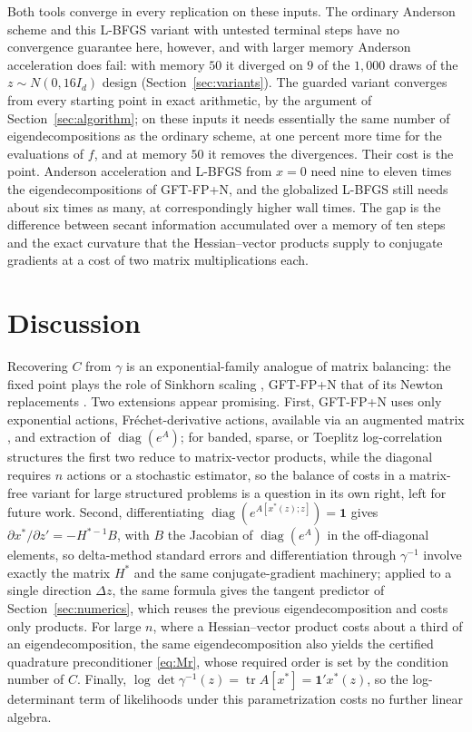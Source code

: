 \documentclass[11pt]{article}
\newcommand{\tr}{\operatorname{tr}}
\newcommand{\diag}{\operatorname{diag}}
\newcommand{\one}{\mathbf{1}}
\begin{document}
Both tools converge in every replication on these inputs. The
ordinary Anderson scheme and this L-BFGS variant with untested
terminal steps have no convergence guarantee here, however, and with
larger memory Anderson acceleration does fail: with memory $50$ it
diverged on $9$ of the $1{,}000$ draws of the $z\sim N(0,16I_d)$
design (Section~\ref{sec:variants}). The guarded variant converges
from every starting point in exact arithmetic, by the argument of
Section~\ref{sec:algorithm}; on these inputs it needs essentially the
same number of eigendecompositions as the ordinary scheme, at one
percent more time for the evaluations of $f$, and at memory $50$ it
removes the divergences. Their cost is the point. Anderson acceleration and L-BFGS from $x=0$
need nine to eleven times the eigendecompositions of GFT-FP+N, and
the globalized L-BFGS still needs about six times as many, at
correspondingly higher wall times.
The gap is the difference between secant information accumulated over
a memory of ten steps and the exact curvature that the Hessian--vector
products supply to conjugate gradients at a cost of two matrix
multiplications each.

\section{Discussion}\label{sec:discussion}

Recovering $C$ from $\gamma$ is an exponential-family analogue of
matrix balancing: the fixed point plays the role of Sinkhorn scaling
\citep{Sinkhorn:1964}, GFT-FP+N that of its Newton replacements
\citep{KnightRuiz:2013}. Two extensions appear promising. First, GFT-FP+N uses only
exponential actions, Fr\'echet-derivative actions, available via an
augmented matrix \citep{AlMohyHigham:2009}, and extraction of
$\diag(e^{A})$; for banded, sparse, or Toeplitz log-correlation
structures the first two reduce to matrix-vector products, while the
diagonal requires $n$ actions or a stochastic estimator, so the
balance of costs in a matrix-free variant for large structured
problems is a question in its own right, left for future work. Second, differentiating
$\diag(e^{A[x^{\ast}(z);z]})=\one$ gives
$\partial x^{\ast}/\partial z'=-H^{\ast-1}B$, with $B$ the Jacobian of
$\diag(e^{A})$ in the off-diagonal elements, so delta-method standard
errors and differentiation through $\gamma^{-1}$ involve exactly the
matrix $H^{\ast}$ and the same conjugate-gradient machinery; applied
to a single direction $\Delta z$, the same formula gives the tangent
predictor of Section~\ref{sec:numerics}, which reuses the previous
eigendecomposition and costs only products. For large $n$, where a
Hessian--vector product costs about a third of an eigendecomposition,
the same eigendecomposition also yields the certified quadrature
preconditioner \eqref{eq:Mr}, whose required order is set by the
condition number of $C$. Finally,
$\log\det\gamma^{-1}(z)=\tr A[x^{\ast}]=\one'x^{\ast}(z)$, so the
log-determinant term of likelihoods under this parametrization costs
no further linear algebra.
\end{document}
